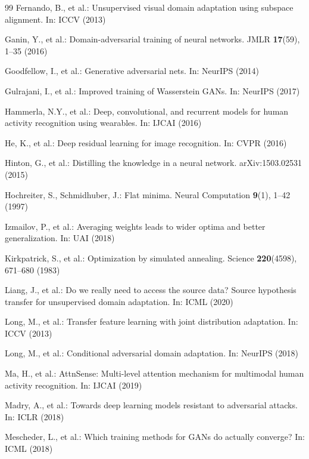 \documentclass[conference]{IEEEtran}
\begin{document}
\begin{thebibliography}{99}
Fernando, B., et al.: Unsupervised visual domain adaptation using subspace alignment. In: ICCV (2013)

Ganin, Y., et al.: Domain-adversarial training of neural networks. JMLR \textbf{17}(59), 1--35 (2016)

Goodfellow, I., et al.: Generative adversarial nets. In: NeurIPS (2014)

Gulrajani, I., et al.: Improved training of Wasserstein GANs. In: NeurIPS (2017)

Hammerla, N.Y., et al.: Deep, convolutional, and recurrent models for human activity recognition using wearables. In: IJCAI (2016)

He, K., et al.: Deep residual learning for image recognition. In: CVPR (2016)

Hinton, G., et al.: Distilling the knowledge in a neural network. arXiv:1503.02531 (2015)

Hochreiter, S., Schmidhuber, J.: Flat minima. Neural Computation \textbf{9}(1), 1--42 (1997)

Izmailov, P., et al.: Averaging weights leads to wider optima and better generalization. In: UAI (2018)

Kirkpatrick, S., et al.: Optimization by simulated annealing. Science \textbf{220}(4598), 671--680 (1983)

Liang, J., et al.: Do we really need to access the source data? Source hypothesis transfer for unsupervised domain adaptation. In: ICML (2020)

Long, M., et al.: Transfer feature learning with joint distribution adaptation. In: ICCV (2013)

Long, M., et al.: Conditional adversarial domain adaptation. In: NeurIPS (2018)

Ma, H., et al.: AttnSense: Multi-level attention mechanism for multimodal human activity recognition. In: IJCAI (2019)

Madry, A., et al.: Towards deep learning models resistant to adversarial attacks. In: ICLR (2018)

Mescheder, L., et al.: Which training methods for GANs do actually converge? In: ICML (2018)


\end{thebibliography}
\end{document}
